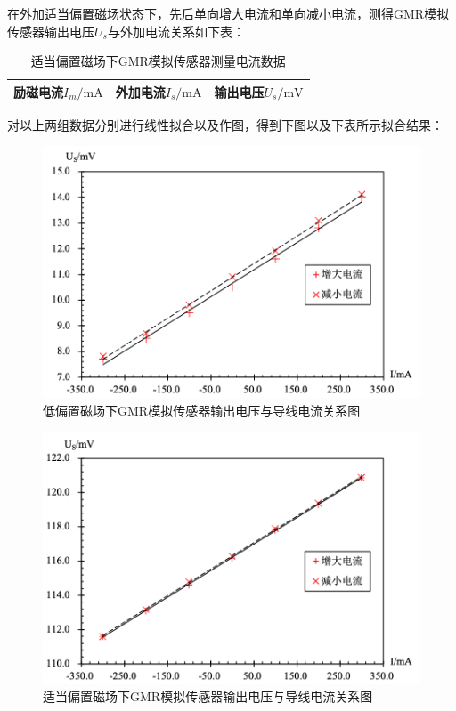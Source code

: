 \documentclass{thuemp}
\begin{document}
在外加适当偏置磁场状态下，先后单向增大电流和单向减小电流，测得GMR模拟传感器输出电压$U_s$与外加电流关系如下表：

\begin{table}[H]
    \centering
    \captionnamefont{\wuhao\bf\heiti}
    \captiontitlefont{\wuhao\bf\heiti}
    \caption{适当偏置磁场下GMR模拟传感器测量电流数据} \label{tab:gmr_current_high}
    \liuhao
    \begin{tabular}{|c|c|c|}
        \toprule
        励磁电流$I_m/\mathrm{mA}$ & 外加电流$I_s/\mathrm{mA}$ & 输出电压$U_s/\mathrm{mV}$ \\ \hline
        \midrule
        \bottomrule
    \end{tabular}
\end{table}

对以上两组数据分别进行线性拟合以及作图，得到下图以及下表所示拟合结果：

\begin{figure}[H]
    \centering
    \includegraphics[width=0.8\linewidth]{../Data/GMR-Plot-04-01-excel.png}
    \caption{低偏置磁场下GMR模拟传感器输出电压与导线电流关系图} \label{fig:gmr_current}
\end{figure}

\begin{figure}[H]
    \centering
    \includegraphics[width=0.8\linewidth]{../Data/GMR-Plot-04-02-excel.png}
    \caption{适当偏置磁场下GMR模拟传感器输出电压与导线电流关系图} \label{fig:gmr_current}
\end{figure}
\end{document}
